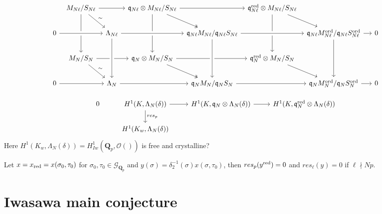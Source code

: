 \documentclass[leqno]{amsart}
\newcommand{\Gp}{\mathcal{G}_{\Qp}} %
\newcommand{\red}{\textnormal{red}}
\newcommand{\ord}{\textnormal{ord}}
\newcommand{\Qp}{\mathbf{Q}_p}
\newcommand{\oo}{\mathcal{O}} %
\newcommand{\fq}{\mathfrak{q}}
\theoremstyle{definition}
\theoremstyle{remark}
\begin{document}
\begin{equation*}
\begin{tikzcd}[column sep=tiny]
& M_{N\ell}/S_{N\ell}\arrow{dd} \arrow[rd,"\sim"]\arrow[rr]
&& \fq_{N\ell}\otimes M_{N\ell}/S_{N\ell}
	\arrow[rd,twoheadrightarrow]\arrow[rr]\arrow[dd]
&& \fq_{N\ell}^{\red}\otimes M_{N\ell}/S_{N\ell}\arrow[dd]\arrow[rd]\\
0 \arrow[crossing over]{rr} 
&& \Lambda_{N\ell}
	\arrow[crossing over]{dd} \arrow[crossing over]{rr} 
&& \fq_{N\ell}M_{N\ell}/\fq_{N\ell}S_{N\ell}
	\arrow[crossing over]{dd}\arrow[crossing over]{rr} 
&& \fq_{N\ell}M_{N\ell}^{\ord}/\fq_{N\ell}S^{\ord}_{N\ell}
	\arrow{dd} \arrow[rr] && 0\\
& M_{N}/S_{N}\arrow{rr}\arrow[rd,"\sim"]
&& \fq_{N}\otimes M_{N}/S_{N}
	\arrow{rr} \arrow[rd,twoheadrightarrow]
&& \fq_{N}^{\red}\otimes M_{N}/S_{N} \arrow[rd]& & & \\
0 \arrow[crossing over]{rr} 
&& \Lambda_{N} \arrow[crossing over]{rr} 
&& \fq_{N}M_{N}/\fq_{N}S_{N}\arrow[crossing over]{rr} 
&& \fq_{N}M_{N}^{\ord}/\fq_{N}S_{N}^{\ord} \arrow[rr] && 0
\arrow[from=2-3,to=4-3,crossing over]
\arrow[from=2-5,to=4-5,crossing over]
\end{tikzcd}
\end{equation*}

\[
\begin{tikzcd}
0&
H^1(K,\Lambda_N(\delta)) \arrow[r]\arrow[d,"res_p"]&
H^1(K,\fq_N\otimes \Lambda_N(\delta)) \arrow[r]&
H^1(K,\fq_N^{\red}\otimes \Lambda_N(\delta))\\
&H^1(K_w,\Lambda_N(\delta))
\end{tikzcd}
\]
Here $H^1(K_w,\Lambda_N(\delta))=H_{Iw}^1(\Qp,\oo())$
is free and crystalline?

Let $x=x_{\red}=x(\sigma_0,\tau_0)$
for $\sigma_0,\tau_0\in \Gp$
and  $y(\sigma)=\delta_2^{-1}(\sigma)x(\sigma,\tau_0)$,
then $res_p(y^{\red})=0$
and $res_\ell(y)=0$ if  $\ell\nmid Np$.


\section{Iwasawa main conjecture}




\end{document}
